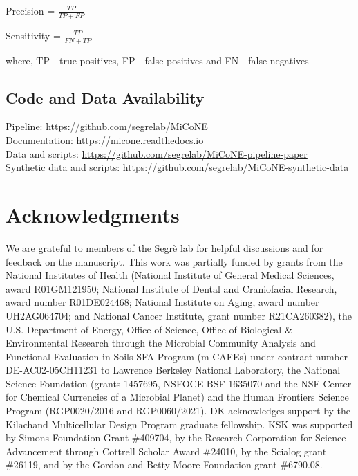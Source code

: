 \documentclass[letterpaper,12pt]{article}
\begin{document}
  Precision = $\frac{TP}{TP + FP}$

  Sensitivity = $\frac{TP}{FN + TP}$

  where, TP - true positives, FP - false positives and FN - false negatives

  \subsection*{Code and Data Availability}
  Pipeline: \href{https://github.com/segrelab/MiCoNE}{https://github.com/segrelab/MiCoNE} \\
  Documentation: \href{https://micone.readthedocs.io}{https://micone.readthedocs.io} \\
  Data and scripts: \href{https://github.com/segrelab/MiCoNE-pipeline-paper}{https://github.com/segrelab/MiCoNE-pipeline-paper} \\
  Synthetic data and scripts: \href{https://github.com/segrelab/MiCoNE-synthetic-data}{https://github.com/segrelab/MiCoNE-synthetic-data}


\section*{Acknowledgments}

We are grateful to members of the Segrè lab for helpful discussions and for feedback on the manuscript. This work was partially funded by grants from the National Institutes of Health (National Institute of General Medical Sciences, award R01GM121950; National Institute of Dental and Craniofacial Research, award number R01DE024468; National Institute on Aging, award number UH2AG064704; and National Cancer Institute, grant number R21CA260382), the U.S. Department of Energy, Office of Science, Office of Biological \& Environmental Research through the Microbial Community Analysis and Functional Evaluation in Soils SFA Program (m-CAFEs) under contract number DE-AC02-05CH11231 to Lawrence Berkeley National Laboratory, the National Science Foundation (grants 1457695, NSFOCE-BSF 1635070 and the NSF Center for Chemical Currencies of a Microbial Planet) and the Human Frontiers Science Program (RGP0020/2016 and RGP0060/2021).
DK acknowledges support by the Kilachand Multicellular Design Program graduate fellowship.
KSK was supported by Simons Foundation Grant \#409704, by the Research Corporation for Science Advancement through Cottrell Scholar Award \#24010, by the Scialog grant \#26119, and by the Gordon and Betty Moore Foundation grant \#6790.08.
\end{document}
